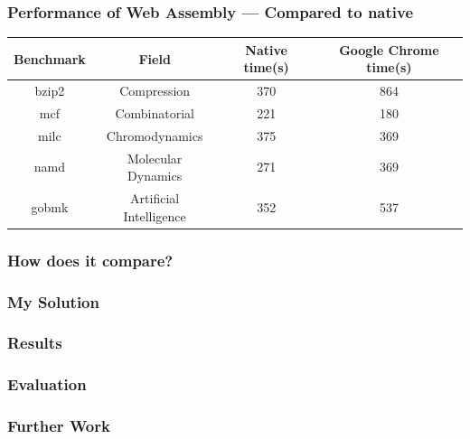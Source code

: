 \documentclass{beamer}
\begin{document}
\begin{frame}
    \frametitle{Performance of Web Assembly — Compared to native}

    {\small
        \begin{table}[H]
            \centering
            \vspace*{6pt}
            \label{native}
            \begin{tabular}{cccc}\hline\hline
                Benchmark & Field                   & Native time(s) & Google Chrome time(s) \\ \hline
                bzip2     & Compression             & 370            & 864                   \\
                mcf       & Combinatorial           & 221            & 180                   \\
                milc      & Chromodynamics          & 375            & 369                   \\
                namd      & Molecular Dynamics      & 271            & 369                   \\
                gobmk     & Artificial Intelligence & 352            & 537
            \end{tabular}
        \end{table}
    }
\end{frame}

\begin{frame}
    \frametitle{How does it compare?}
\end{frame}

\begin{frame}
    \frametitle{My Solution}
\end{frame}

\begin{frame}
    \frametitle{Results}
\end{frame}

\begin{frame}
    \frametitle{Evaluation}
\end{frame}

\begin{frame}
    \frametitle{Further Work}
\end{frame}
\end{document}
